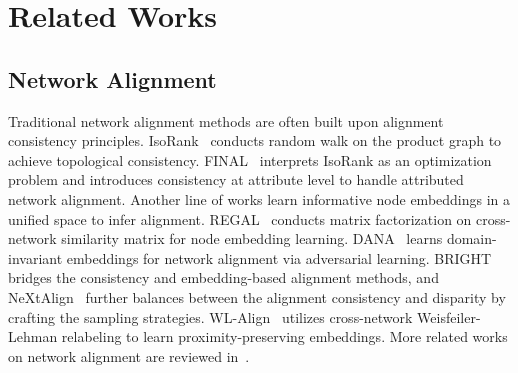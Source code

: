 \vspace{-5pt}
\section{Related Works}\label{sec:related}
\vspace{-3pt}
\subsection{Network Alignment}
Traditional network alignment methods are often built upon alignment consistency principles.
IsoRank~\cite{isorank} conducts random walk on the product graph to achieve topological consistency. FINAL~\cite{final} interprets IsoRank as an optimization problem and introduces consistency at attribute level to handle attributed network alignment.
Another line of works \cite{li2022unsupervised,wang2023networked,yan2022dissecting} learn informative node embeddings in a unified space to infer alignment.
REGAL~\cite{regal} conducts matrix factorization on cross-network similarity matrix for node embedding learning.
DANA~\cite{dana} learns domain-invariant embeddings for network alignment via adversarial learning.
BRIGHT~\cite{bright} bridges the consistency and embedding-based alignment methods, and NeXtAlign~\cite{nextalign} further balances between the alignment consistency and disparity by crafting the sampling strategies.
WL-Align~\cite{wlalign} utilizes cross-network Weisfeiler-Lehman relabeling to learn proximity-preserving embeddings. 
More related works on network alignment are reviewed in~\cite{du2021new}.

\vspace{-3pt}
